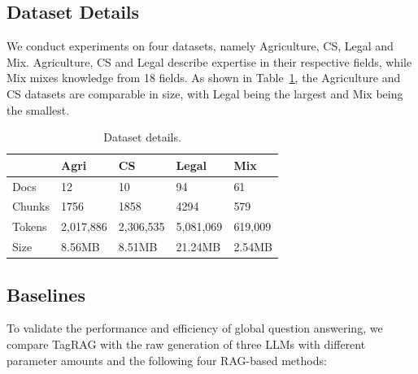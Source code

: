 \documentclass[11pt]{article}
\begin{document}
\subsection{Dataset Details}
\label{app:dataset}
We conduct experiments on four datasets, namely Agriculture, CS, Legal and Mix.
Agriculture, CS and Legal describe expertise in their respective fields, while Mix mixes knowledge from 18 fields.
As shown in Table~\ref{tab:dataset details}, the Agriculture and CS datasets are comparable in size, with Legal being the largest and Mix being the smallest.

\begin{table}[h]
\centering
\small
\begin{tabularx}{0.48\textwidth}{lXXXX}
\toprule
          & Agri  & CS     & Legal  & Mix    \\ \midrule
Docs      & 12    & 10     & 94     & 61     \\
Chunks    & 1756  & 1858   & 4294   & 579    \\
Tokens    & 2,017,886 & 2,306,535 & 5,081,069 & 619,009  \\
Size      & 8.56MB & 8.51MB  & 21.24MB & 2.54MB   \\ 
\bottomrule
\end{tabularx}
\caption{Dataset details.}
\label{tab:dataset details}
\end{table}


\subsection{Baselines}
\label{app:baseline}
To validate the performance and efficiency of global question answering, we compare TagRAG with the raw generation of three LLMs with different parameter amounts and the following four RAG-based methods:
\end{document}
